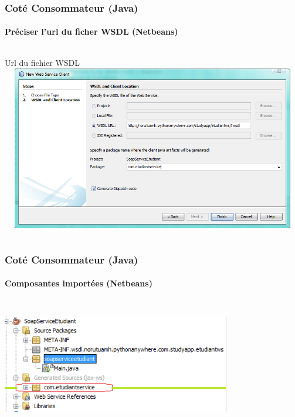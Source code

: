 \begin{frame}
\frametitle{Coté Consommateur (Java)}
\framesubtitle{Préciser l'url du ficher WSDL (Netbeans)}
\transsplithorizontalin[duration=1]
\begin{columns}
\begin{column}{16cm}
 \begin{alertblock}{Url du fichier WSDL}
 \includegraphics[width=16cm,height=7.2cm]{images/clientCaptures/etape5_client_web_service_wsdl.png}
  \end{alertblock}
\end{column}
\end{columns}
\end{frame}

\begin{frame}
\frametitle{Coté Consommateur (Java)}
\framesubtitle{Composantes importées (Netbeans)}
\transsplithorizontalin[duration=1]
\begin{columns}
\begin{column}{10cm}
 \begin{alertblock}{}
 \includegraphics[width=10cm,height=5cm]{images/clientCaptures/etape6_projet_genere.png}
  \end{alertblock}
\end{column}
\end{columns}
\end{frame}

